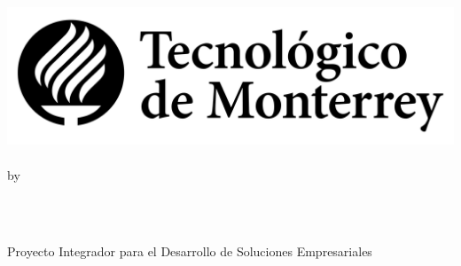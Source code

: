 \documentclass[11pt, a4paper, oneside]{thesis} %
\title{\ttitle}
\begin{document}
\frontmatter
{}

\fancyhead{}
\rhead{\thepage}
\lhead{}

\pagestyle{fancy}
\newcommand{\HRule}{\rule{\linewidth}{0.5mm}}

\hypersetup{pdfsubject=\subjectname}
\hypersetup{pdfkeywords=\keywordnames}


\begin{titlepage}
\begin{center}

\textsc{\Large \univname}\\
\textsc{\Large \facname}\\
\textsc{\Large \schoolname}\\[1cm]
\includegraphics[scale=.3]{logo.png} \\
\\[0.5cm]

\large by\\[0.5cm]

\begin{minipage}{0.4\textwidth}
\begin{center} \large
{}
\large{\href{mailto:A01703947@exatec.tec.mx?subject=Awesome thesis, man!}{\authornames}} 
\\[0.5cm] 
\end{center}
\end{minipage}\\[0.5cm]

\large Proyecto Integrador para el Desarrollo de Soluciones Empresariales \\ \textit{\degreename}\\[0.8cm]


\end{center}
\end{titlepage}
\end{document}
